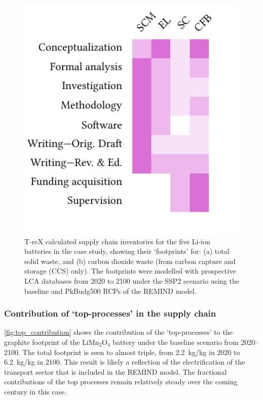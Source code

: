 \begin{figure}[H]
    \centering
    \includegraphics[width=19cm]{figures/T-reX-wastefootprint-totalANDcarbon.pdf}
    \caption{T-reX calculated supply chain inventories for the five Li-ion batteries in the case study, showing their `footprints' for: (a) total solid waste, and (b) carbon dioxide waste (from carbon capture and storage (CCS) only). The footprints were modelled with prospective LCA databases from 2020 to 2100 under the SSP2 scenario using the baseline and PkBudg500 RCPs of the REMIND model.}\label{fig:waste_totalANDcarbon}
\end{figure}

\subsubsection{Contribution of `top-processes' in the supply chain}%

\autoref{fig:top_contribution} shows the contribution of the `top-processes' to the graphite footprint of the  LiMn\(_2\)O\(_4\) battery under the baseline scenario from 2020--2100. The total footprint is seen to almost triple, from 2.2~kg/kg in 2020 to 6.2~kg/kg in 2100. This result is likely a reflection of the electrification of the transport sector that is included in the REMIND model. The fractional contributions of the top processes remain relatively steady over the coming century in this case.


